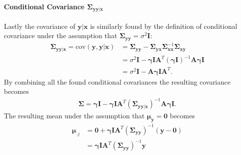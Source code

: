 
\paragraph{Conditional Covariance $\boldsymbol{\Sigma}_{\mathbf{yy} \vert \mathbf{x}}$}
Lastly the covariance of $\mathbf{y} \vert \mathbf{x}$ is similarly found by the definition of conditional covariance under the assumption that $\boldsymbol{\Sigma}_{\mathbf{yy}} = \sigma^2 \mathbf{I}$:
\begin{align*}
\boldsymbol{\Sigma}_{\mathbf{yy} \vert \mathbf{x}} =  \text{cov} ( \mathbf{y} , \mathbf{y} \vert \mathbf{x}) &= \boldsymbol{\Sigma}_{\mathbf{yy}} - \boldsymbol{\Sigma}_{\mathbf{yx}} \boldsymbol{\Sigma}_{\mathbf{xx}}^{-1} \boldsymbol{\Sigma}_{\mathbf{xy}} \\
&= \sigma^2 \mathbf{I} - \boldsymbol{\gamma} \mathbf{I} \mathbf{A}^T (\boldsymbol{\gamma} \mathbf{I})^{-1} \mathbf{A} \boldsymbol{\gamma} \mathbf{I} \\
&= \sigma^2 \mathbf{I} - \mathbf{A} \boldsymbol{\gamma}\mathbf{I} \mathbf{A}^T.
\end{align*} 
By combining all the found conditional covariances the resulting covariance becomes 
\begin{align*}
\boldsymbol{\Sigma} = \boldsymbol{\gamma} \mathbf{I} - \boldsymbol{\gamma} \mathbf{I} \mathbf{A}^T (\boldsymbol{\Sigma}_{\mathbf{yy} \vert \mathbf{x}})^{-1} \mathbf{A} \boldsymbol{\gamma} \mathbf{I}.
\end{align*}
The resulting mean under the assumption that $\boldsymbol{\mu}_{\mathbf{y}} = \mathbf{0}$ becomes
\begin{align*}
\boldsymbol{\mu}_{\cdot j} &= \mathbf{0} + \boldsymbol{\gamma} \mathbf{I} \mathbf{A}^T \left( \boldsymbol{\Sigma}_{\mathbf{yy}} \right)^{-1} \left(\mathbf{y} - \mathbf{0}\right) \\
&= \boldsymbol{\gamma} \mathbf{I} \mathbf{A}^T \left( \boldsymbol{\Sigma}_{\mathbf{yy}} \right)^{-1} \mathbf{y}
\end{align*}  
